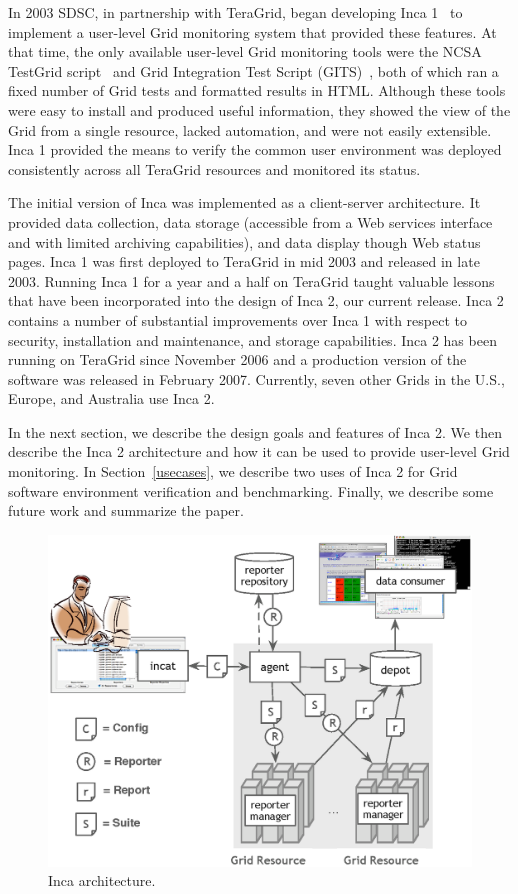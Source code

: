 \documentclass[times,10pt,twocolumn]{article}
\begin{document}

\noindent In 2003 SDSC, in partnership with TeraGrid, began developing Inca
1~\cite{inca1} to implement a user-level Grid monitoring system that provided
these features.  At that time, the only available user-level Grid
monitoring tools were the NCSA TestGrid script~\cite{ncsa-test} and
Grid Integration Test Script (GITS)~\cite{gits}, both of which ran a fixed number of Grid tests and formatted
results in HTML.  Although these tools were easy to install and produced
useful information, they showed the view of the Grid from a single
resource, lacked automation, and were not easily extensible.  Inca 1 provided
the means to verify the common user environment was deployed consistently across all TeraGrid
resources and monitored its status.

The initial
version of Inca was implemented as a client-server architecture.  It provided
data collection, data storage (accessible from a Web services interface and with 
limited archiving capabilities), and data display though Web status
pages.  Inca 1 was first deployed to TeraGrid in mid 2003 and released in late
2003. Running Inca 1 for a year and a half on TeraGrid taught 
valuable lessons that have been incorporated into the design of Inca 2, our
current release.  Inca 2
contains a number of substantial improvements over Inca 1 with respect to
security, installation and maintenance, and storage capabilities.  Inca 2 has
been running on TeraGrid since November 2006 and a production
version of the software was released in February 2007.  Currently, seven other Grids in the
U.S., Europe, and Australia use Inca 2.  

In the next section, we describe the design goals and features of Inca 2. 
We then describe the Inca 2 architecture and how it can be used to provide
user-level Grid monitoring.  In Section~\ref{usecases}, we describe two 
uses of Inca 2 for Grid software environment verification and benchmarking.  
Finally, we describe some future work and summarize the paper.

  
\begin{figure}[tbp]
  \centering
  \includegraphics[width=.6\textwidth]{arch.eps}
  \caption{\label{arch_fig} Inca architecture.}
\end{figure}
\end{document}
